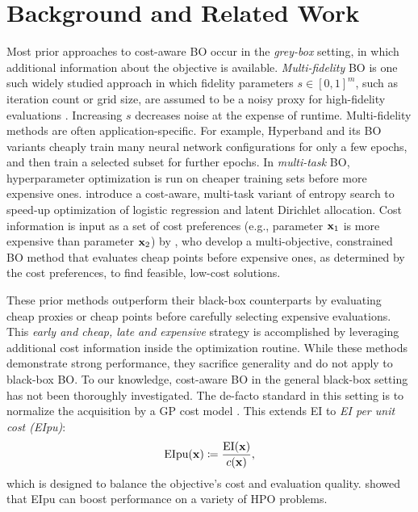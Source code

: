 \documentclass{article}
\newcommand{\EI}{{\text{EI}}}
\newcommand{\EIpu}{{\text{EIpu}}}
\begin{document}
\section{Background and Related Work}\label{Related Work}
Most prior approaches to cost-aware BO occur in the \textit{grey-box} setting, in which additional information about the objective is available. \textit{Multi-fidelity} BO is one such widely studied approach in which fidelity parameters $s \in [0, 1]^m$, such as iteration count or grid size, are assumed to be a noisy proxy for high-fidelity evaluations \cite{forrester2007multi, kandasamy2017multi, poloczek2017multi, wu2019practical}. Increasing $s$ decreases noise at the expense of runtime. Multi-fidelity methods are often application-specific. For example, Hyperband \cite{li2017hyperband} and its BO variants \cite{falkner2018bohb, klein2016fast, klein2017fastbo} cheaply train many neural network configurations for only a few epochs, and then train a selected subset for further epochs. In \textit{multi-task} BO, hyperparameter optimization is run on cheaper training sets before more expensive ones. \citet{swersky2013multi} introduce a cost-aware, multi-task variant of entropy search to speed-up optimization of logistic regression and latent Dirichlet allocation. Cost information is input as a set of cost preferences (e.g., parameter ${\mathbf x}_1$ is more expensive than parameter ${\mathbf x}_2$) by  \citet{abdolshah2019costaware}, who develop a multi-objective, constrained BO method that evaluates cheap points before expensive ones, as determined by the cost preferences, to find feasible, low-cost solutions.

These prior methods outperform their black-box counterparts by evaluating cheap proxies or cheap points before carefully selecting expensive evaluations. This \textit{early and cheap, late and expensive} strategy is accomplished by leveraging additional cost information inside the optimization routine. While these methods demonstrate strong performance, they sacrifice generality and do not apply to black-box BO. To our knowledge, cost-aware BO in the general black-box setting has not been thoroughly investigated. The de-facto standard in this setting is to normalize the acquisition by a GP cost model \cite{snoek2012practical}. This extends EI to \textit{EI per unit cost (EIpu)}:
\begin{equation}
    \EIpu(\xb ) \coloneqq \frac{\EI(\xb)}{c(\xb )},
\end{equation}
which is designed to balance the objective's cost and evaluation quality. \citet{snoek2012practical} showed that EIpu can boost performance on a variety of HPO problems.
\end{document}
